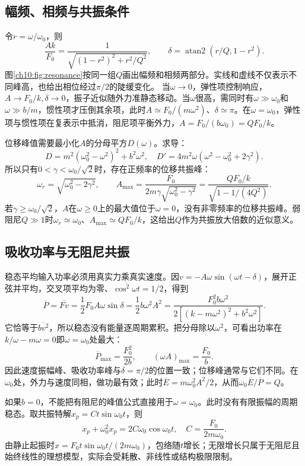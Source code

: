 \subsection{幅频、相频与共振条件}
令$r=\omega/\omega_0$，则
\[
 \frac{Ak}{F_0}=\frac1{\sqrt{(1-r^2)^2+r^2/Q^2}},\qquad
 \delta=\operatorname{atan2}(r/Q,1-r^2).
\]
图\ref{ch10:fig:resonance}按同一组$Q$画出幅频和相频两部分。实线和虚线不仅表示不同峰高，也给出相位经过$\pi/2$的陡缓变化。
\chTenResonanceFigure
当$\omega\to0$，弹性项控制响应，$A\to F_0/k,\delta\to0$，振子近似随外力准静态移动。当$\omega$很高，需同时有$\omega\gg\omega_0$和$\omega\gg b/m$，惯性项才压倒其余项，此时$A\simeq F_0/(m\omega^2)$、$\delta\simeq\pi$。在$\omega=\omega_0$，弹性项与惯性项在复表示中抵消，阻尼项平衡外力，$A=F_0/(b\omega_0)=QF_0/k$。

位移峰值需要最小化$A$的分母平方$D(\omega)$。求导：
\[
 D=m^2(\omega_0^2-\omega^2)^2+b^2\omega^2,
 \quad D'=4m^2\omega(\omega^2-\omega_0^2+2\gamma^2).
\]
所以只有$0<\gamma<\omega_0/\sqrt2$时，存在正频率的位移共振峰：
\[
 \omega_r=\sqrt{\omega_0^2-2\gamma^2},\qquad
 A_{\max}=\frac{F_0}{2m\gamma\sqrt{\omega_0^2-\gamma^2}}
 =\frac{QF_0/k}{\sqrt{1-1/(4Q^2)}}.
\]
若$\gamma\geq\omega_0/\sqrt2$，$A$在$\omega\geq0$上的最大值位于$\omega=0$，没有非零频率的位移共振峰。弱阻尼$Q\gg1$时$\omega_r\simeq\omega_0$、$A_{\max}\simeq QF_0/k$，这给出$Q$作为共振放大倍数的近似意义。

\subsection{吸收功率与无阻尼共振}
稳态平均输入功率必须用真实力乘真实速度。因$v=-A\omega\sin(\omega t-\delta)$，展开正弦并平均，交叉项平均为零、$\overline{\cos^2\omega t}=1/2$，得到
\begin{equation}\label{ch10:eq:power}
 \overline P=\overline{Fv}=\frac12F_0A\omega\sin\delta
 =\frac12b\omega^2A^2
 =\frac{F_0^2b\omega^2}{2[(k-m\omega^2)^2+b^2\omega^2]}.
\end{equation}
它恰等于$\overline{bv^2}$，所以稳态没有能量逐周期累积。把分母除以$\omega^2$，可看出功率在$k/\omega-m\omega=0$即$\omega=\omega_0$处最大：
\[
 \overline P_{\max}=\frac{F_0^2}{2b},\qquad
 (\omega A)_{\max}=\frac{F_0}{b}.
\]
因此速度振幅峰、吸收功率峰与$\delta=\pi/2$的位置一致；位移峰通常与它们不同。在$\omega_0$处，外力与速度同相，做功最有效；此时$\overline E=m\omega_0^2A^2/2$，从而$\omega_0\overline E/\overline P=Q$。

如果$b=0$，不能把有阻尼的峰值公式直接用于$\omega=\omega_0$。此时没有有限振幅的周期稳态。取共振特解$x_p=Ct\sin\omega_0t$，则
\[
 \ddot x_p+\omega_0^2x_p=2C\omega_0\cos\omega_0t,
 \quad C=\frac{F_0}{2m\omega_0}.
\]
由静止起振时$x=F_0t\sin\omega_0t/(2m\omega_0)$，包络随$t$增长；无限增长只属于无阻尼且始终线性的理想模型，实际会受耗散、非线性或结构极限限制。

